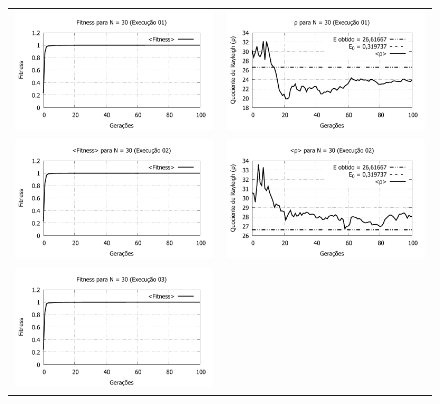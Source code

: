 \newpage
\begin{figure}[p]
\centering
  \begin{tabular}{@{}cc@{}}
    \includegraphics[width=.45\textwidth]{figs/resultados/fitnessGrad/N30_01_fitness.pdf} &
    \includegraphics[width=.45\textwidth]{figs/resultados/fitnessGrad/N30_01_rho.pdf}   \\
		\includegraphics[width=.45\textwidth]{figs/resultados/fitnessGrad/N30_02_fitness.pdf} &
    \includegraphics[width=.45\textwidth]{figs/resultados/fitnessGrad/N30_02_rho.pdf}   \\
		\includegraphics[width=.45\textwidth]{figs/resultados/fitnessGrad/N30_03_fitness.pdf} &

\end{tabular}
\end{figure}
